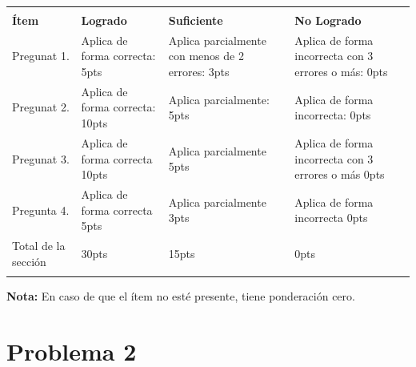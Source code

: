 \documentclass{exam}
\begin{document}
\begin{enumerate}
\begin{questions}
\end{questions}

\begin{table}[H]
  \centering
  \begin{tabular}{
    !{\color{gray!50}\vrule}p{3.9cm}
    !{\color{gray!50}\vrule}p{3.6cm}
    !{\color{gray!50}\vrule}p{3.6cm}
    !{\color{gray!50}\vrule}p{3.6cm}
    !{\color{gray!50}\vrule}}  \hline
     \\ 
    \hline
    \textbf{Ítem} & \textbf{Logrado} & \textbf{Suficiente} & \textbf{No Logrado}\\  \hline\newline
    Pregunat 1. &
    Aplica de forma correcta: 5pts   &
    Aplica parcialmente con menos de 2 errores: 3pts  &
    Aplica de forma incorrecta con 3 errores o más: 0pts \\  \hline

    Pregunat 2. &
    Aplica de forma correcta: 10pts   &
    Aplica parcialmente: 5pts  &
    Aplica de forma incorrecta: 0pts \\  \hline

    Pregunat 3. &
    Aplica de forma correcta 10pts   &
    Aplica parcialmente 5pts &
    Aplica de forma incorrecta con 3 errores o más 0pts\\  \hline

    Pregunta 4. &
    Aplica de forma correcta 5pts &
    Aplica parcialmente  3pts &
    Aplica de forma incorrecta  0pts\\  \hline

    Total de la sección &  30pts & 15pts & 0pts\\  \hline
  \end{tabular}
  \label{tbl:1}
\end{table}

\vspace{-5mm} \textbf{Nota:} En caso de que el ítem no esté presente,
tiene ponderación cero.



\newpage
\vspace{-7mm}
\section{\textbf{Problema 2}}
\noindent


\end{enumerate}
\end{document}
